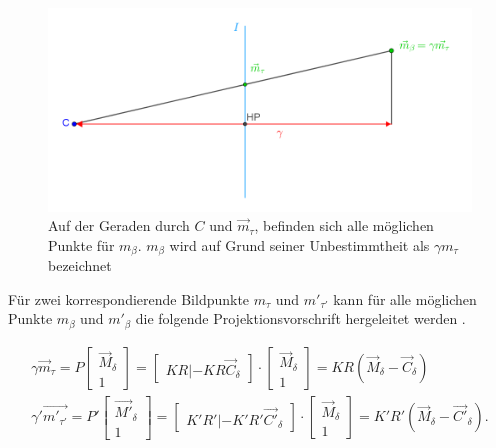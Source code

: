 \begin{figure}[!htb]
	\centering
	\includegraphics[width=0.8\linewidth]{images/gamma.png}
	\caption[Veranschaulichung der freien Variablen $\gamma$]{Auf der Geraden durch $C$ und $\overrightarrow{m}_\tau$, befinden sich alle möglichen Punkte für $m_\beta$. $m_\beta$ wird auf Grund seiner Unbestimmtheit als $\gamma m_\tau$ bezeichnet}  
	\label{fig:gamma}
\end{figure}


Für zwei korrespondierende Bildpunkte $m_\tau$ und $ m'_{\tau'}$ kann für alle möglichen Punkte $m_\beta$ und $m'_\beta$ die folgende Projektionsvorschrift hergeleitet werden \cite{Elements}.

\begin{gather}
	\gamma \overrightarrow{m}_\tau = P \begin{bmatrix}\overrightarrow{M}_\delta\\1\end{bmatrix} = 
	\begin{bmatrix}KR|-KR\overrightarrow{C}_\delta\end{bmatrix}\cdot \begin{bmatrix}\overrightarrow{M}_\delta\\1\end{bmatrix} = KR(\overrightarrow{M}_\delta - \overrightarrow{C}_\delta)\\
	\gamma' \overrightarrow{m'_{\tau'}} = P' \begin{bmatrix}\overrightarrow{M'}_\delta\\1\end{bmatrix} = 
	\begin{bmatrix}K'R'|-K'R'\overrightarrow{C'}_\delta\end{bmatrix}\cdot \begin{bmatrix}\overrightarrow{M}_\delta\\1\end{bmatrix} = K'R'(\overrightarrow{M}_\delta - \overrightarrow{C'}_\delta).\label{eq:Homo}
\end{gather}\\



